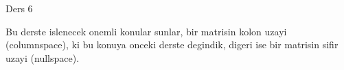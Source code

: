 \documentclass[12pt,fleqn]{article}\usepackage{../common}
\begin{document}
Ders 6

Bu derste islenecek onemli konular sunlar, bir matrisin kolon uzayi
(columnspace), ki bu konuya onceki derste degindik, digeri ise bir
matrisin sifir uzayi (nullspace). 
\end{document}
